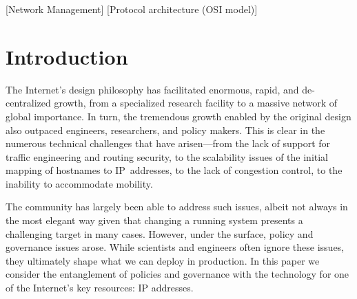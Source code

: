 \documentclass[letter]{sigcomm-alternate}
\begin{document}
\begin{abstract}

With the ongoing exhaustion of free address pools at the registries serving
the global demand for IPv4 address space, scarcity has become reality.
Networks in need of address space can no longer get more address allocations 
from their respective registries.

In this work we frame the fundamentals of the IPv4 address exhaustion phenomena
and connected issues. We elaborate on how the current ecosystem of IPv4 address
space has evolved since the standardization of IPv4, leading to the rather
complex and opaque scenario we face today. We outline the evolution in
address space management as well as address space use patterns, identifying
key factors of the scarcity issues. We characterize the possible solution
space to overcome these issues and open the perspective of address blocks as
virtual resources, which involves issues such as differentiation between address
blocks, the need for resource certification, and issues arising when
transferring address space between networks.
 
\end{abstract}

[Network
Management]
[Protocol 
architecture (OSI model)]


\section{Introduction}
\label{sec:intro}

The Internet's design philosophy has facilitated enormous, rapid, and
de-centralized growth, from a specialized research facility to a massive
network of global importance.  In turn, the tremendous growth enabled by
the original design also outpaced engineers, researchers, and policy
makers.  This is clear in the numerous technical challenges that have
arisen---from the lack of support for traffic engineering and routing
security, to the scalability issues of the initial mapping of hostnames
to IP~addresses, to the lack of congestion control, to the inability to
accommodate mobility.

The community has largely been able to address such issues, albeit not
always in the most elegant way given that changing a running system
presents a challenging target in many cases.  However, under the
surface, policy and governance issues arose.  While scientists and
engineers often ignore these issues, they ultimately shape what we can
deploy in production.  In this paper we consider the entanglement of 
policies and governance with the technology for one of the Internet's
key resources: IP addresses.
\end{document}
